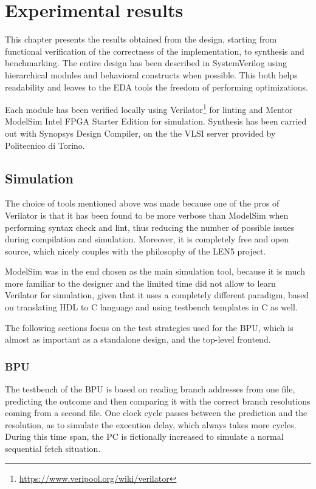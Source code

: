 \chapter{Experimental results}
This chapter presents the results obtained from the design, starting from functional verification of the correctness of the implementation, to synthesis and benchmarking. The entire design has been described in SystemVerilog using hierarchical modules and behavioral constructs when possible. This both helps readability and leaves to the EDA tools the freedom of performing optimizations.

Each module has been verified locally using Verilator\footnote{\url{https://www.veripool.org/wiki/verilator}} for linting and Mentor ModelSim Intel \acs{FPGA} Starter Edition for simulation. Synthesis has been carried out with Synopsys Design Compiler, on the the VLSI server provided by Politecnico di Torino.

\section{Simulation}
The choice of tools mentioned above was made because one of the pros of Verilator is that it has been found to be more verbose than ModelSim when performing syntax check and lint, thus reducing the number of possible issues during compilation and simulation. Moreover, it is completely free and open source, which nicely couples with the philosophy of the LEN5 project.

ModelSim was in the end chosen as the main simulation tool, because it is much more familiar to the designer and the limited time did not allow to learn Verilator for simulation, given that it uses a completely different paradigm, based on translating \acs{HDL} to C language and using testbench templates in C as well.

The following sections focus on the test strategies used for the \ac{BPU}, which is almost as important as a standalone design, and the top-level frontend.

\subsection{\acs{BPU}}
The testbench of the \ac{BPU} is based on reading branch addresses from one file, predicting the outcome and then comparing it with the correct branch resolutions coming from a second file. One clock cycle passes between the prediction and the resolution, as to simulate the execution delay, which always takes more cycles. During this time span, the \ac{PC} is fictionally increased to simulate a normal sequential fetch situation.

